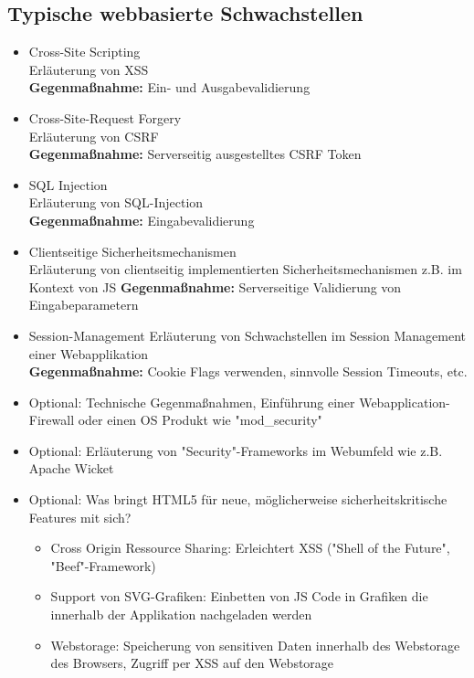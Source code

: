 \subsection{Typische webbasierte Schwachstellen}
\begin{itemize}
      \item Cross-Site Scripting\\
        Erläuterung von XSS\\ 
      	\textbf{Gegenmaßnahme:} Ein- und Ausgabevalidierung
      \item Cross-Site-Request Forgery\\
        Erläuterung von CSRF\\ 
      	\textbf{Gegenmaßnahme:} Serverseitig ausgestelltes CSRF Token
      \item SQL Injection\\
        Erläuterung von SQL-Injection\\ 
      	\textbf{Gegenmaßnahme:} Eingabevalidierung 
      \item Clientseitige Sicherheitsmechanismen\\
        Erläuterung von clientseitig implementierten Sicherheitsmechanismen z.B. im Kontext von JS  
        \textbf{Gegenmaßnahme:} Serverseitige Validierung von Eingabeparametern
      \item Session-Management
        Erläuterung von Schwachstellen im Session Management einer Webapplikation\\ 
      	\textbf{Gegenmaßnahme:} Cookie Flags verwenden, sinnvolle Session Timeouts, etc. 
      \item Optional: Technische Gegenmaßnahmen, Einführung einer Webapplication-Firewall oder einen OS Produkt wie "mod\_security"
      \item Optional: Erläuterung von "Security"-Frameworks im Webumfeld wie z.B. Apache Wicket
      \item Optional: Was bringt HTML5 für neue, möglicherweise sicherheitskritische Features mit sich?
      \begin{itemize}
         \item Cross Origin Ressource Sharing: Erleichtert XSS ("Shell of the Future", "Beef"-Framework) 
         \item Support von SVG-Grafiken: Einbetten von JS Code in Grafiken die innerhalb der Applikation nachgeladen werden
         \item Webstorage: Speicherung von sensitiven Daten innerhalb des Webstorage des Browsers, Zugriff per XSS auf den Webstorage
      \end{itemize}      
\end{itemize}


